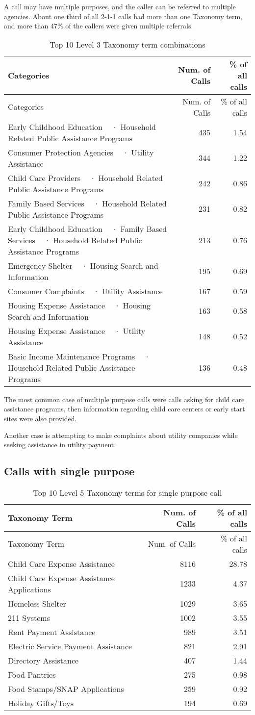 \documentclass[]{tufte-handout}
\begin{document}
A call may have multiple purposes, and the caller can be referred to
multiple agencies. About one third of all 2-1-1 calls had more than one
Taxonomy term, and more than 47\% of the callers were given multiple
referrals.

\begin{longtable}[]{@{}lrr@{}}
\caption{Top 10 Level 3 Taxonomy term combinations}\tabularnewline
\toprule
Categories & Num. of Calls & \% of all calls\tabularnewline
\midrule
\endfirsthead
\toprule
Categories & Num. of Calls & \% of all calls\tabularnewline
\midrule
\endhead
Early Childhood Education ~ · Household Related Public Assistance
Programs & 435 & 1.54\tabularnewline
Consumer Protection Agencies ~ · Utility Assistance & 344 &
1.22\tabularnewline
Child Care Providers ~ · Household Related Public Assistance Programs &
242 & 0.86\tabularnewline
Family Based Services ~ · Household Related Public Assistance Programs &
231 & 0.82\tabularnewline
Early Childhood Education ~ · Family Based Services ~ · Household
Related Public Assistance Programs & 213 & 0.76\tabularnewline
Emergency Shelter ~ · Housing Search and Information & 195 &
0.69\tabularnewline
Consumer Complaints ~ · Utility Assistance & 167 & 0.59\tabularnewline
Housing Expense Assistance ~ · Housing Search and Information & 163 &
0.58\tabularnewline
Housing Expense Assistance ~ · Utility Assistance & 148 &
0.52\tabularnewline
Basic Income Maintenance Programs ~ · Household Related Public
Assistance Programs & 136 & 0.48\tabularnewline
\bottomrule
\end{longtable}

The most common case of multiple purpose calls were calls asking for
child care assistance programs, then information regarding child care
centers or early start sites were also provided.

Another case is attempting to make complaints about utility companies
while seeking assistance in utility payment.

\subsection{Calls with single purpose}\label{calls-with-single-purpose}

\begin{longtable}[]{@{}lrr@{}}
\caption{Top 10 Level 5 Taxonomy terms for single purpose
call}\tabularnewline
\toprule
Taxonomy Term & Num. of Calls & \% of all calls\tabularnewline
\midrule
\endfirsthead
\toprule
Taxonomy Term & Num. of Calls & \% of all calls\tabularnewline
\midrule
\endhead
Child Care Expense Assistance & 8116 & 28.78\tabularnewline
Child Care Expense Assistance Applications & 1233 & 4.37\tabularnewline
Homeless Shelter & 1029 & 3.65\tabularnewline
211 Systems & 1002 & 3.55\tabularnewline
Rent Payment Assistance & 989 & 3.51\tabularnewline
Electric Service Payment Assistance & 821 & 2.91\tabularnewline
Directory Assistance & 407 & 1.44\tabularnewline
Food Pantries & 275 & 0.98\tabularnewline
Food Stamps/SNAP Applications & 259 & 0.92\tabularnewline
Holiday Gifts/Toys & 194 & 0.69\tabularnewline
\bottomrule
\end{longtable}
\end{document}
